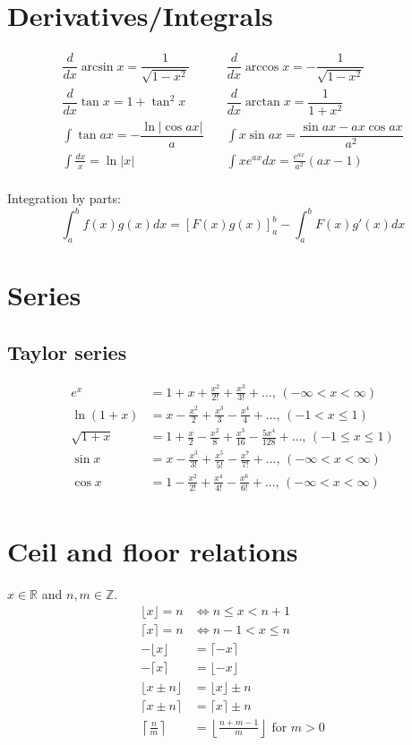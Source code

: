 \section{Derivatives/Integrals}
\begin{align*}
\dfrac{d}{dx}\arcsin x = \dfrac{1}{\sqrt{1-x^2}} & \quad
\dfrac{d}{dx}\arccos x = -\dfrac{1}{\sqrt{1-x^2}}\\
\dfrac{d}{dx}\tan x = 1+\tan^2 x & \quad
\dfrac{d}{dx}\arctan x = \dfrac{1}{1+x^2}\\
\int\tan ax = -\dfrac{\ln|\cos ax|}{a} & \quad
\int x\sin ax = \dfrac{\sin ax-ax \cos ax}{a^2}\\
\int \frac{dx}{x} = \ln|x| & \quad
\int xe^{ax}dx = \frac{e^{ax}}{a^2}(ax-1)\\
\end{align*}

Integration by parts:
$$\int_a^bf(x)g(x)dx = [F(x)g(x)]_a^b-\int_a^bF(x)g'(x)dx$$

\section{Series} 
\subsection{Taylor series}
\begin{align*}
e^x &= 1+x+\frac{x^2}{2!}+\frac{x^3}{3!}+\dots,\,(-\infty<x<\infty)\\
\ln(1+x) &= x-\frac{x^2}{2}+\frac{x^3}{3}-\frac{x^4}{4}+\dots,\,(-1<x\leq1)\\
\sqrt{1+x} &= 1+\frac{x}{2}-\frac{x^2}{8}+\frac{x^3}{16}-\frac{5x^4}{128}+\dots,\,(-1\leq x\leq1)\\
\sin x &= x-\frac{x^3}{3!}+\frac{x^5}{5!}-\frac{x^7}{7!}+\dots,\,(-\infty<x<\infty)\\
\cos x &= 1-\frac{x^2}{2!}+\frac{x^4}{4!}-\frac{x^6}{6!}+\dots,\,(-\infty<x<\infty)\\
\end{align*}

\section{Ceil and floor relations}
$x\in\mathbb R$ and $n,m\in\mathbb Z$.
\begin{align*}
\lfloor x \rfloor = n &\Leftrightarrow n\leq x < n+1\\
\lceil x \rceil = n &\Leftrightarrow n-1< x \leq n\\
-\lfloor x \rfloor & = \lceil -x \rceil\\
-\lceil x \rceil & = \lfloor -x \rfloor\\
\lfloor x\pm n \rfloor & = \lfloor x \rfloor\pm n\\
\lceil x\pm n \rceil & = \lceil x \rceil\pm n\\
\left\lceil \frac nm \right\rceil & = \left\lfloor \frac{n+m-1}{m} \right\rfloor \textrm{ for } m>0\\
\end{align*}

